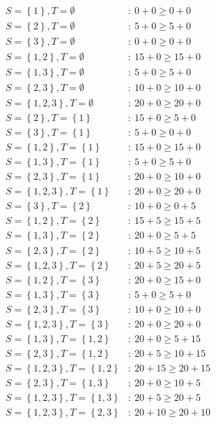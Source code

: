 \documentclass[american]{scrartcl}
\newcommand{\set}[1]{\left\{#1\right\}}
\begin{document}
\begin{equation*}
    \begin{split}
        S=\set{1}, T=\emptyset&: \ 0+0 \geq 0+0 \\
        S=\set{2}, T=\emptyset&: \ 5+0 \geq 5+0 \\
        S=\set{3}, T=\emptyset&: \ 0+0 \geq 0+0 \\
        S=\set{1, 2}, T=\emptyset&: \ 15+0 \geq 15+0 \\
        S=\set{1, 3}, T=\emptyset&: \ 5+0 \geq 5+0 \\
        S=\set{2, 3}, T=\emptyset&: \ 10+0 \geq 10+0 \\
        S=\set{1, 2, 3}, T=\emptyset&: \ 20+0 \geq 20+0 \\
        S=\set{2}, T=\set{1}&: \ 15+0 \geq 5+0 \\
        S=\set{3}, T=\set{1}&: \ 5+0 \geq 0+0 \\
        S=\set{1, 2}, T=\set{1}&: \ 15+0 \geq 15+0 \\
        S=\set{1, 3}, T=\set{1}&: \ 5+0 \geq 5+0 \\
        S=\set{2, 3}, T=\set{1}&: \ 20+0 \geq 10+0 \\
        S=\set{1, 2, 3}, T=\set{1}&: \ 20+0 \geq 20+0 \\
        S=\set{3}, T=\set{2}&: \ 10+0 \geq 0+5 \\
        S=\set{1, 2}, T=\set{2}&: \ 15+5 \geq 15+5 \\
        S=\set{1, 3}, T=\set{2}&: \ 20+0 \geq 5+5 \\
        S=\set{2, 3}, T=\set{2}&: \ 10+5 \geq 10+5 \\
        S=\set{1, 2, 3}, T=\set{2}&: \ 20+5 \geq 20+5 \\
        S=\set{1, 2}, T=\set{3}&: \ 20+0 \geq 15+0 \\
        S=\set{1, 3}, T=\set{3}&: \ 5+0 \geq 5+0 \\
        S=\set{2, 3}, T=\set{3}&: \ 10+0 \geq 10+0 \\
        S=\set{1, 2, 3}, T=\set{3}&: \ 20+0 \geq 20+0 \\
        S=\set{1, 3}, T=\set{1, 2}&: \ 20+0 \geq 5+15 \\
        S=\set{2, 3}, T=\set{1, 2}&: \ 20+5 \geq 10+15 \\
        S=\set{1, 2, 3}, T=\set{1, 2}&: \ 20+15 \geq 20+15 \\
        S=\set{2, 3}, T=\set{1, 3}&: \ 20+0 \geq 10+5 \\
        S=\set{1, 2, 3}, T=\set{1, 3}&: \ 20+5 \geq 20+5 \\
        S=\set{1, 2, 3}, T=\set{2, 3}&: \ 20+10 \geq 20+10
    \end{split}
\end{equation*}
\end{document}
